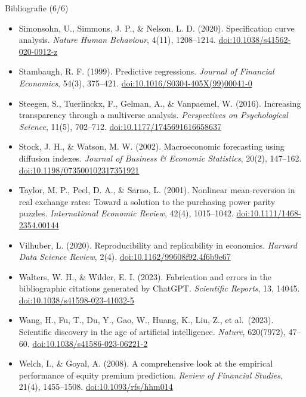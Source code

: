 \begin{frame}{Bibliografie (6/6)}
\itemsize{\tiny}
\begin{itemize}
    \item Simonsohn, U., Simmons, J. P., \& Nelson, L. D. (2020). Specification curve analysis. \textit{Nature Human Behaviour}, 4(11), 1208--1214. \href{https://doi.org/10.1038/s41562-020-0912-z}{doi:10.1038/s41562-020-0912-z}
    \item Stambaugh, R. F. (1999). Predictive regressions. \textit{Journal of Financial Economics}, 54(3), 375--421. \href{https://doi.org/10.1016/S0304-405X(99)00041-0}{doi:10.1016/S0304-405X(99)00041-0}
    \item Steegen, S., Tuerlinckx, F., Gelman, A., \& Vanpaemel, W. (2016). Increasing transparency through a multiverse analysis. \textit{Perspectives on Psychological Science}, 11(5), 702--712. \href{https://doi.org/10.1177/1745691616658637}{doi:10.1177/1745691616658637}
    \item Stock, J. H., \& Watson, M. W. (2002). Macroeconomic forecasting using diffusion indexes. \textit{Journal of Business \& Economic Statistics}, 20(2), 147--162. \href{https://doi.org/10.1198/073500102317351921}{doi:10.1198/073500102317351921}
    \item Taylor, M. P., Peel, D. A., \& Sarno, L. (2001). Nonlinear mean-reversion in real exchange rates: Toward a solution to the purchasing power parity puzzles. \textit{International Economic Review}, 42(4), 1015--1042. \href{https://doi.org/10.1111/1468-2354.00144}{doi:10.1111/1468-2354.00144}
    \item Vilhuber, L. (2020). Reproducibility and replicability in economics. \textit{Harvard Data Science Review}, 2(4). \href{https://doi.org/10.1162/99608f92.4f6b9e67}{doi:10.1162/99608f92.4f6b9e67}
    \item Walters, W. H., \& Wilder, E. I. (2023). Fabrication and errors in the bibliographic citations generated by ChatGPT. \textit{Scientific Reports}, 13, 14045. \href{https://doi.org/10.1038/s41598-023-41032-5}{doi:10.1038/s41598-023-41032-5}
    \item Wang, H., Fu, T., Du, Y., Gao, W., Huang, K., Liu, Z., et al.\ (2023). Scientific discovery in the age of artificial intelligence. \textit{Nature}, 620(7972), 47--60. \href{https://doi.org/10.1038/s41586-023-06221-2}{doi:10.1038/s41586-023-06221-2}
    \item Welch, I., \& Goyal, A. (2008). A comprehensive look at the empirical performance of equity premium prediction. \textit{Review of Financial Studies}, 21(4), 1455--1508. \href{https://doi.org/10.1093/rfs/hhm014}{doi:10.1093/rfs/hhm014}

\end{itemize}
\end{frame}
